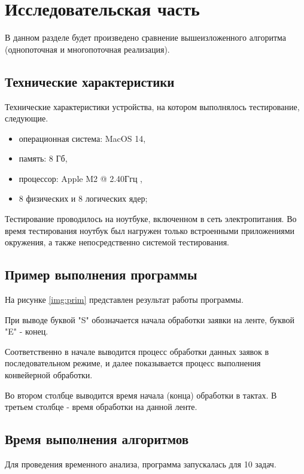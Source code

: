 \chapter{Исследовательская часть}
В данном разделе будет произведено сравнение вышеизложенного алгоритма (однопоточная и многопоточная реализация).

\section{Технические характеристики}

Технические характеристики устройства, на котором выполнялось тестирование, следующие.

\begin{itemize}
	\item операционная система: MacOS 14,
	\item память: 8 Гб,
	\item процессор: Apple M2 @ 2.40Ггц \cite{intel},
	\item 8 физических и 8 логических ядер;
\end{itemize}

Тестирование проводилось на ноутбуке, включенном в сеть электропитания. Во время тестирования ноутбук был нагружен только встроенными приложениями окружения, а также непосредственно системой тестирования.

\section{Пример выполнения программы}
На рисунке \ref{img:prim} представлен результат работы программы.

При выводе буквой "S" обозначается начала обработки заявки на ленте, буквой "E" - конец.

Соответственно в начале выводится процесс обработки данных заявок в последовательном режиме, и далее показывается процесс выполнения конвейерной обработки.

Во втором столбце выводится время начала (конца) обработки в тактах. В третьем столбце - время обработки на данной ленте.

\clearpage

\section{Время выполнения алгоритмов}

Для проведения временного анализа, программа запускалась для 10 задач.

